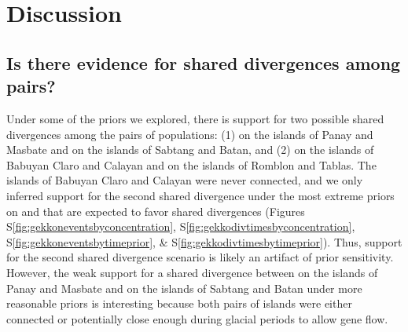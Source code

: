 \section{Discussion}

\subsection{Is there evidence for shared divergences among  pairs?}

Under some of the priors we explored, there is support for two possible shared
divergences among the pairs of  populations:
(1)
 on the islands of Panay and Masbate
and
 on the islands of Sabtang and Batan,
and (2)
 on the islands of Babuyan Claro and Calayan
and
 on the islands of Romblon and Tablas.
The islands of Babuyan Claro and Calayan were never connected,
and we only inferred support for the second shared divergence
under the most extreme priors on \concentration and
\divtime that are expected to favor shared divergences
(Figures
S\ref{fig:gekkoneventsbyconcentration},
S\ref{fig:gekkodivtimesbyconcentration},
S\ref{fig:gekkoneventsbytimeprior},
\&
S\ref{fig:gekkodivtimesbytimeprior}).
Thus, support for the second shared divergence scenario is likely an
artifact of prior sensitivity.
However, the weak support for a shared divergence between
 on the islands of Panay and Masbate
and
 on the islands of Sabtang and Batan
under more reasonable priors is interesting because both pairs of islands were
either connected or potentially close enough during glacial periods to allow
gene flow.

